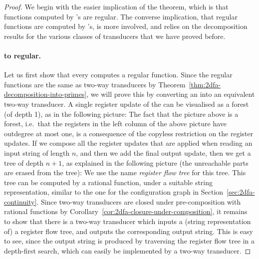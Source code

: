 \begin{proof} We begin with the easier implication of the theorem, which is that functions computed by \sst's are regular. The converse implication, that regular functions are computed by \sst's, is more involved, and relies on the decomposition results for the various classes of transducers that we have proved before.
\paragraph*{\sst to regular.} Let us first show that every \sst computes a regular function. Since the regular functions are the same as two-way transducers by Theorem~\ref{thm:2dfa-decomposition-into-primes}, we will prove this by converting an \sst into an equivalent two-way transducer. A single register update of the \sst can be visualised as a forest (of depth 1), as in the following picture:
The fact that the picture above is a forest, i.e.~that the registers in the left column of the above picture have outdegree at most one, is a consequence of the copyless restriction on the register updates.
If we compose all the register updates that are applied when reading an input string of length $n$, and then we add the final output update, then we get a tree of depth $n+1$, as explained in the following picture (the unreachable parts are erased from the tree):
We use the name \emph{register flow tree} for this tree. This tree can be computed by a rational function, under a suitable string representation, similar to the one for the configuration graph in Section~\ref{sec:2dfa-continuity}. Since two-way transducers are closed under pre-composition with rational functions by Corollary~\ref{cor:2dfa-closure-under-composition}, it remains to show that there is a two-way transducer which inputs a (string representation of) a  register flow tree, and outputs the corresponding output string. This is easy to see, since the output string is produced by traversing the register flow tree in a depth-first search, which can easily be implemented by a two-way transducer. 


\end{proof}
